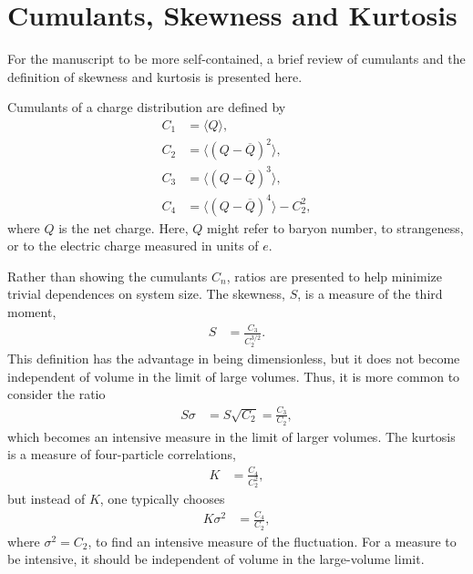 
\section{Cumulants, Skewness and Kurtosis}\label{sec:cumulants}

For the manuscript to be more self-contained, a brief review of cumulants and the definition of skewness and kurtosis is presented here.

Cumulants of a charge distribution are defined by 
\begin{align}
C_1 &= \langle Q\rangle,\\ \nonumber
C_2 &= \langle(Q-\overline{Q})^2\rangle,\\ \nonumber
C_3 &= \langle(Q-\overline{Q})^3\rangle,\\ \nonumber
C_4 &= \langle(Q-\overline{Q})^4\rangle-C_2^2, \nonumber
\end{align}
where $Q$ is the net charge. Here, $Q$ might refer to baryon number, to strangeness, or to the electric charge measured in units of $e$.

Rather than showing the cumulants $C_n$, ratios are presented to help minimize trivial dependences on system size. The skewness, $S$, is a measure of the third moment,
\begin{eqnarray}
S&=\frac{C_3}{C_2^{3/2}}.
\end{eqnarray}
This definition has the advantage in being dimensionless, but it does not become independent of volume in the limit of large volumes. Thus, it is more common to consider the ratio
\begin{eqnarray}
S\sigma&=S\sqrt{C_2}=\frac{C_3}{C_2},
\end{eqnarray}
which becomes an intensive measure in the limit of larger volumes. The kurtosis is a measure of four-particle correlations,
\begin{eqnarray}
K&=\frac{C_4}{C_2^2},
\end{eqnarray}
but instead of $K$, one typically chooses
\begin{eqnarray}
K\sigma^2&=\frac{C_4}{C_2},
\end{eqnarray}
where $\sigma^2=C_2$, to find an intensive measure of the fluctuation. For a measure to be intensive, it should be independent of volume in the large-volume limit.

